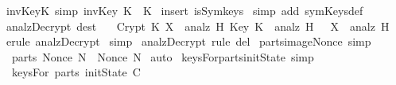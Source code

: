 \begin{isabellebody}
  \ invKey{\isacharunderscore}K\ {\isacharbrackleft}simp{\isacharbrackright}{\isacharcolon}\ {\isachardoublequoteopen}invKey\ K\ {\isacharequal}\ K{\isachardoublequoteclose}\isanewline
  \isadelimproof
  \endisadelimproof
  \isatagproof
  \isamarkupfalse%
  \ {\isacharparenleft}insert\ isSym{\isacharunderscore}keys{\isacharparenright}\isanewline
  \isamarkupfalse%
  \ {\isacharparenleft}simp\ add{\isacharcolon}\ symKeys{\isacharunderscore}def{\isacharparenright}\isanewline
  \isamarkupfalse%
  \endisatagproof
  {\isafoldproof}%
  \isadelimproof
  \isanewline
  \endisadelimproof
  \isanewline
  \isanewline
  \isamarkupfalse%
  \ analz{\isacharunderscore}Decrypt{\isacharprime}\ {\isacharbrackleft}dest{\isacharbrackright}{\isacharcolon}\isanewline
  \ \ {\isachardoublequoteopen}{\isasymlbrakk}\ Crypt\ K\ X\ {\isasymin}\ analz\ H{\isacharsemicolon}\ Key\ K\ {\isasymin}\ analz\ H\ {\isasymrbrakk}\ {\isasymLongrightarrow}\ X\ {\isasymin}\ analz\ H{\isachardoublequoteclose}\isanewline
  \isadelimproof
  \endisadelimproof
  \isatagproof
  \isamarkupfalse%
  \ {\isacharparenleft}erule\ analz{\isachardot}Decrypt{\isacharparenright}\isanewline
  \isamarkupfalse%
  \ {\isacharparenleft}simp{\isacharparenright}\isanewline
  \isamarkupfalse%
  \endisatagproof
  {\isafoldproof}%
  \isadelimproof
  \isanewline
  \endisadelimproof
  \isanewline
  \isanewline
  \isamarkupfalse%
  \ analz{\isachardot}Decrypt\ {\isacharbrackleft}rule\ del{\isacharbrackright}\isanewline
  \isanewline
  \isanewline
  \isamarkupfalse%
  \ parts{\isacharunderscore}image{\isacharunderscore}Nonce\ {\isacharbrackleft}simp{\isacharbrackright}\ {\isacharcolon}\isanewline
  \ \ {\isachardoublequoteopen}parts\ {\isacharparenleft}Nonce{\isacharbackquote}\ N{\isacharparenright}\ {\isacharequal}\ Nonce{\isacharbackquote}\ N{\isachardoublequoteclose}\isanewline
  \isadelimproof
  \endisadelimproof
  \isatagproof
  \isamarkupfalse%
  \ auto%
  \endisatagproof
  {\isafoldproof}%
  \isadelimproof
  \isanewline
  \endisadelimproof
  \isanewline
  \isanewline
  \isamarkupfalse%
  \ keysFor{\isacharunderscore}parts{\isacharunderscore}initState\ {\isacharbrackleft}simp{\isacharbrackright}\ {\isacharcolon}\ \isanewline
  \ \ {\isachardoublequoteopen}keysFor\ {\isacharparenleft}parts\ {\isacharparenleft}initState\ C{\isacharparenright}{\isacharparenright}\ {\isacharequal}\ {\isacharbraceleft}{\isacharbraceright}{\isachardoublequoteclose}\isanewline

\end{isabellebody}
